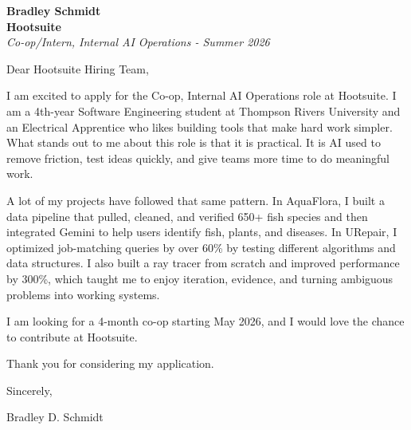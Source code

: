 \documentclass[11pt]{article}
\begin{document}
\textbf{Bradley Schmidt}\\
\vspace{0.5em}
\textbf{Hootsuite}\\
\textit{Co-op/Intern, Internal AI Operations - Summer 2026}

Dear Hootsuite Hiring Team,

\par

I am excited to apply for the Co-op, Internal AI Operations role at Hootsuite. I am a 4th-year Software Engineering student at Thompson Rivers University and an Electrical Apprentice who likes building tools that make hard work simpler. What stands out to me about this role is that it is practical. It is AI used to remove friction, test ideas quickly, and give teams more time to do meaningful work.

\par

A lot of my projects have followed that same pattern. In AquaFlora, I built a data pipeline that pulled, cleaned, and verified 650+ fish species and then integrated Gemini to help users identify fish, plants, and diseases. In URepair, I optimized job-matching queries by over 60\% by testing different algorithms and data structures. I also built a ray tracer from scratch and improved performance by 300\%, which taught me to enjoy iteration, evidence, and turning ambiguous problems into working systems.

\par

I am looking for a 4-month co-op starting May 2026, and I would love the chance to contribute at Hootsuite.

\par

Thank you for considering my application.

\par

Sincerely,

\par

Bradley D. Schmidt
\end{document}
